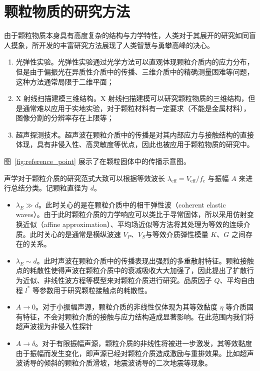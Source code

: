 \section{颗粒物质的研究方法}

由于颗粒物质本身具有高度复杂的结构与力学特性，人类对于其展开的研究如同盲人摸象，所开发的丰富研究方法展现了人类智慧与勇攀高峰的决心。

\begin{enumerate}
  \item 光弹性实验\cite{photoelasticimetry}。光弹性实验通过光学方法可以直观体现颗粒介质内的应力分布，但是由于偏振光在异质性介质中的传播、三维介质中的精确测量困难等问题\cite{Non-Destructive_3D_Photoelasticity}，这种方法通常局限于二维平面；
  \item X 射线扫描建模三维结构\cite{PhysRevE.68.020301}。X 射线扫描建模可以研究颗粒物质的三维结构，但是通常难以应用于实地实验，对于颗粒材料有一定要求（不能是金属材料），图像分割的分辨率存在上限等；
  \item 超声探测技术。超声波在颗粒介质中的传播是对其内部应力与接触结构的直接体现，具有非侵入性、高灵敏度等优点，因此也被应用于颗粒物质的研究中。
\end{enumerate}



图~\ref{fig:reference_point} 展示了在颗粒固体中的传播示意图。

声学对于颗粒介质的研究范式大致可以根据等效波长 $\lambda_{\text{eff}} = V_{\text{eff}}/f_{c}$ 与振幅 $A$ 来进行总结分类。记颗粒直径为 $d$。

\begin{itemize}
  \item $\lambda_{E}\gg d$。此时关心的是在颗粒介质中的相干弹性波（coherent elastic waves）。由于此时颗粒介质的力学响应可以类比于寻常固体，所以采用仿射变换近似（affine approximation）、平均场近似等方法将其处理为等效的连续介质。此时关心的是通常是横纵波速 $V_{P}$、$V_{S}$与等效介质弹性模量 $K$、$G$ 之间存在的关系。
  \item $\lambda_{E}\sim d$。此时声波在颗粒介质中的传播表现出强烈的多重散射特征。颗粒接触点的耗散性使得声波在颗粒介质中的衰减吸收大大加强了，因此提出了扩散行为近似\cite{PhysRevLett.93.154303}、非线性波方程\cite{Transitional,hamilton_nonlinear_1998}等模型来对颗粒介质进行研究。品质因子 $Q$、平均自由程 $l^{*}$ 等参数用于研究颗粒接触点的耗散性。
  \item $A\rightarrow 0$。对于小振幅声源，颗粒介质的非线性仅体现为其等效黏度 $\eta$ 等介质固有特征，不会对颗粒介质的接触与应力结构造成显著影响。在此范围内我们将超声波视为非侵入性探针
  \item $A\rightarrow \delta$。对于有限振幅声源，颗粒介质的非线性将被进一步激发，其等效黏度由于振幅而发生变化，即声源已经对颗粒介质造成激励与重排效果。比如超声波诱导的倾斜的颗粒介质滑坡\cite{PhysRevE.102.042901}，地震波诱导的二次地震\cite{johnson_nonlinear_2005}等现象。
\end{itemize}

